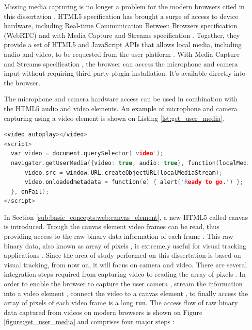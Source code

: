 Missing media capturing is no longer a problem for the modern browsers cited in this dissertation \cite{WebRTC2013,Hickson2013}. HTML5 specification \cite{Hickson2013} has brought a surge of access to device hardware, including Real-time Communication Between Browsers specification (WebRTC) \cite{WebRTC2013} and with Media Capture and Streams specification \cite{MediaCapture2013}. Together, they provide a set of HTML5 \cite{Hickson2013} and JavaScript \cite{International2009} APIs \cite{WebRTC2013} that allows local media, including audio and video, to be requested from the user platform \cite{WC2006}. With Media Capture and Streams specification \cite{MediaCapture2013}, the browser can access the microphone and camera input without requiring third-party plugin installation. It's available directly into the browser.

The microphone and camera hardware access can be used in combination with the HTML5 \cite{Hickson2013} audio and video elements. An example of microphone and camera capturing using a video element is shown on Listing \ref{lst:get_user_media}.

\begin{lstlisting}[language=C++,label={lst:get_user_media},caption=Capture microphone and camera and display using a HTML5 video element.]
<video autoplay></video>
<script>
  var video = document.querySelector('video');
  navigator.getUserMedia({video: true, audio: true}, function(localMediaStream) {
      video.src = window.URL.createObjectURL(localMediaStream);
      video.onloadedmetadata = function(e) { alert('Ready to go.') };
  }, onFail);
</script>
\end{lstlisting}

In Section \ref{sub:basic_concepts:web:canvas_element}, a new HTML5 \cite{Hickson2013} called canvas \cite{Canvas2013} is introduced. Trough the canvas element \cite{Canvas2013} video frames can be read, thus providing access to the raw binary data information of each frame \cite{Canvas2013,Hickson2013}. This raw binary data, also known as array of pixels \cite{Gonzalez2007}, is extremely useful for visual tracking applications \cite{Teichrieb2007}. Since the area of study performed on this dissertation is based on visual tracking, from now on, it will focus on camera and video. There are several integration steps required from capturing video to reading the array of pixels \cite{Gonzalez2007}. In order to enable the browser to capture the user camera \cite{MediaCapture2013}, stream the information into a video element \cite{Hickson2013}, connect the video to a canvas element \cite{Canvas2013}, to finally access the array of pixels of each video frame is a long run. The access flow of raw binary data captured from videos on modern browsers is shown on Figure \ref{figure:get_user_media} and comprises four major steps \cite{WebRTC2013,Rocks2013}:

